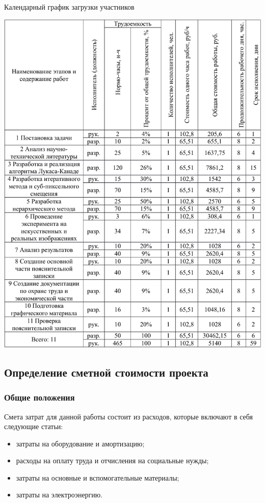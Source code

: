 \begin{table}[!ht]
\caption{Календарный график загрузки участников}
\centering
\includegraphics[page=3, width=1\linewidth]{econom_table.pdf}
\label{tab:eco_3}
\end{table}

\subsection{Определение сметной стоимости проекта}
\subsubsection{Общие положения}

Смета затрат для данной работы состоит из расходов, которые включают в себя следующие статьи:

\begin{itemize}
\item затраты на оборудование и амортизацию;
\item расходы на оплату труда и отчисления на социальные нужды;
\item затраты на основные и вспомогательные материалы;
\item затраты на электроэнергию.
\end{itemize}
